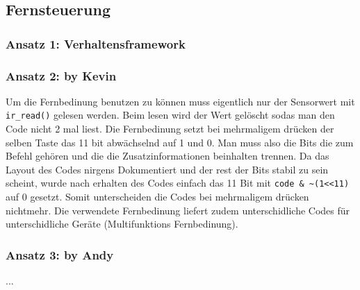 \subsection{Fernsteuerung}
\label{fernsteuerung}

\subsubsection{Ansatz 1: Verhaltensframework}

\subsubsection{Ansatz 2: by Kevin}

Um die Fernbedinung benutzen zu können muss eigentlich nur der Sensorwert mit \verb|ir_read()| gelesen werden. Beim lesen wird der Wert gelöscht sodas man den Code nicht 2 mal liest. Die Fernbedinung setzt bei mehrmaligem drücken der selben Taste das 11 bit abwächselnd auf 1 und 0. Man muss also die Bits die zum Befehl gehören und die die Zusatzinformationen beinhalten trennen. Da das Layout des Codes nirgens Dokumentiert und der rest der Bits stabil zu sein scheint, wurde nach erhalten des Codes einfach das 11 Bit mit \verb|code & ~(1<<11)| auf 0 gesetzt. Somit unterscheiden die Codes bei mehrmaligem drücken nichtmehr. Die verwendete Fernbedinung liefert zudem unterschidliche Codes für unterschidliche Geräte (Multifunktions Fernbedinung).

\subsubsection{Ansatz 3: by Andy}
...
